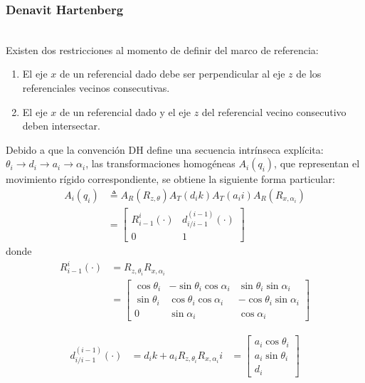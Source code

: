 \documentclass[journal, trans, spanish]{IEEEtran}
\begin{document}
\subsubsection{Denavit Hartenberg}
\\ 
\noindent Existen dos restricciones al momento de definir del marco de referencia: 
\begin{enumerate}
    \item El eje $x$ de un referencial dado debe ser perpendicular al eje $z$ de los referenciales vecinos consecutivas. 
    \item El eje $x$ de un referencial dado y el eje $z$ del referencial vecino consecutivo deben intersectar. 
\end{enumerate}

\noindent Debido a que la convención DH define una secuencia intrínseca explícita: $\theta_i \rightarrow d_i \rightarrow a_i \rightarrow \alpha_i$, las transformaciones homogéneas $A_i (q_i)$, que representan el movimiento rígido correspondiente, se obtiene la siguiente forma particular:
\begin{align*}
    A_i (q_i) & \triangleq A_R (R_{z,\theta}) A_T (d_i k) A_T (a_i i) A_R (R_{x,\alpha_i}) \\
     & = \left[  \begin{array}{cc}
        R_{i-1}^i (\cdot)  & d_{i/i-1}^{(i-1)} (\cdot) \\
         0 & 1  
\end{array} \right]
\end{align*}
donde
\begin{align*}
    R_{i-1}^i (\cdot) & = R_{z,\theta_i}  R_{x,\alpha_i} \\ 
     & = \left[  \begin{array}{ccc}
        \cos{\theta_i}  & -\sin{\theta_i}\cos{\alpha_i} & \sin{\theta_i} \sin{\alpha_i} \\
         \sin{\theta_i} &  \cos{\theta_i}\cos{\alpha_i} &
         -\cos{\theta_i}\sin{\alpha_i} \\
         0 & \sin{\alpha_i} & \cos{\alpha_i}
     \end{array} \right]
\end{align*}

\vspace{2mm}
\begin{equation*}
\begin{array}{ccc}
     d_{i/i-1}^{(i-1)} (\cdot) & = d_i k + a_i R_{z,\theta_i} R_{x,\alpha_i}  i 
     & = \left[  \begin{array}{c}
        a_i \cos{\theta_i} \\
        a_i \sin{\theta_i} \\
        d_i 
     \end{array} \right]
\end{array}
\end{equation*}
\end{document}
